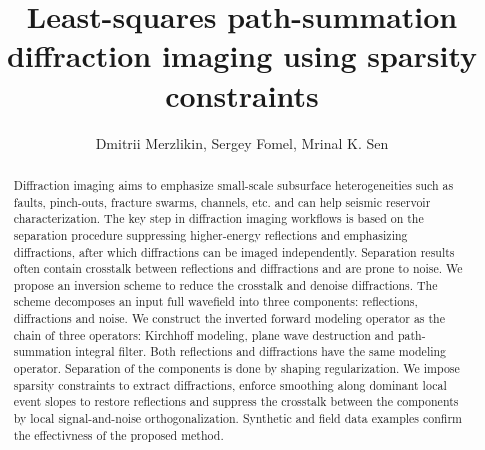 \published{}
\renewcommand{\thefootnote}{\fnsymbol{footnote}}

\title{Least-squares path-summation diffraction imaging using sparsity constraints}

\author{Dmitrii Merzlikin\footnotemark[1], 
	Sergey Fomel\footnotemark[1],
        Mrinal K. Sen\footnotemark[2]}
\maketitle

\address{
\footnotemark[1] Bureau of Economic Geology \\
John A. and Katherine G. Jackson School of Geosciences \\
The University of Texas at Austin \\
University Station, Box X \\
Austin, Texas 78713-8924, USA \\
\footnotemark[2] Institute for Geophysics \\
John A. and Katherine G. Jackson School of Geosciences \\
The University of Texas at Austin \\
J.J. Pickle Research Campus, Bldg. 196 \\
10100 Burnet Road (R2200)\\
Austin, Texas 78758-4445, USA \\
}



\begin{abstract}
Diffraction imaging aims to emphasize small-scale subsurface heterogeneities such as faults,
pinch-outs, fracture swarms, channels, etc. and can help
seismic reservoir characterization. The key step in diffraction imaging workflows is based on the separation procedure
suppressing higher-energy reflections and emphasizing diffractions, after which
diffractions can be imaged independently. Separation results often contain crosstalk between reflections and diffractions
and are prone to noise.
We propose an inversion scheme to reduce the crosstalk and denoise diffractions. The scheme
decomposes an input full wavefield into three components: reflections, diffractions and noise.
We construct the inverted forward modeling operator
as the chain of three operators: Kirchhoff modeling, plane wave destruction and
path-summation integral filter. Both reflections and diffractions have the same modeling operator. Separation of the components
is done by shaping regularization. We impose sparsity constraints to extract diffractions,
enforce smoothing along dominant local event slopes to restore reflections and
suppress the crosstalk between the components by local signal-and-noise orthogonalization. 
Synthetic and field data examples confirm the effectivness of the proposed method. 
\end{abstract}

